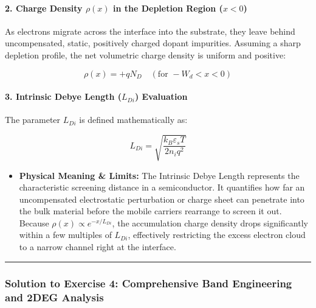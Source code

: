 \documentclass[
]{article}
\providecommand{\tightlist}{%
  \setlength{\itemsep}{0pt}\setlength{\parskip}{0pt}}
\begin{document}
\paragraph{\texorpdfstring{2. Charge Density \(\rho(x)\) in the
Depletion Region
(\(x < 0\))}{2. Charge Density \textbackslash rho(x) in the Depletion Region (x \textless{} 0)}}\label{charge-density-rhox-in-the-depletion-region-x-0}

As electrons migrate across the interface into the substrate, they leave
behind uncompensated, static, positively charged dopant impurities.
Assuming a sharp depletion profile, the net volumetric charge density is
uniform and positive:

\[\rho(x) = +qN_D \quad (\text{for } -W_d < x < 0)\]

\paragraph{\texorpdfstring{3. Intrinsic Debye Length (\(L_{Di}\))
Evaluation}{3. Intrinsic Debye Length (L\_\{Di\}) Evaluation}}\label{intrinsic-debye-length-l_di-evaluation}

The parameter \(L_{Di}\) is defined mathematically as:

\[L_{Di} = \sqrt{\frac{k_B \varepsilon_s T}{2n_i q^2}}\]

\begin{itemize}
\tightlist
\item
  \textbf{Physical Meaning \& Limits:} The Intrinsic Debye Length
  represents the characteristic screening distance in a semiconductor.
  It quantifies how far an uncompensated electrostatic perturbation or
  charge sheet can penetrate into the bulk material before the mobile
  carriers rearrange to screen it out. Because
  \(\rho(x) \propto e^{-x/L_{Di}}\), the accumulation charge density
  drops significantly within a few multiples of \(L_{Di}\), effectively
  restricting the excess electron cloud to a narrow channel right at the
  interface.
\end{itemize}

\begin{center}\rule{0.5\linewidth}{0.5pt}\end{center}

\subsubsection{Solution to Exercise 4: Comprehensive Band Engineering
and 2DEG
Analysis}\label{solution-to-exercise-4-comprehensive-band-engineering-and-2deg-analysis}
\end{document}
